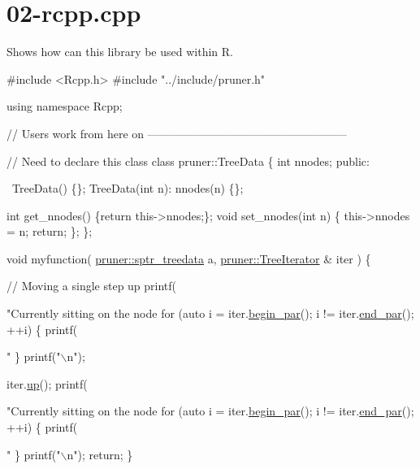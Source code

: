 \hypertarget{02-rcpp_8cpp-example}{}\section{02-\/rcpp.\+cpp}
Shows how can this library be used within R.


\begin{DoxyCodeInclude}
\textcolor{preprocessor}{#include <Rcpp.h>}
\textcolor{preprocessor}{#include "../include/pruner.h"}  

\textcolor{keyword}{using namespace }Rcpp; 

\textcolor{comment}{// Users work from here on -----------------------------------------------------}

\textcolor{comment}{// Need to declare this class}
\textcolor{keyword}{class }pruner::TreeData \{
  \textcolor{keywordtype}{int} nnodes;
\textcolor{keyword}{public}:
  
  ~TreeData() \{\};
  TreeData(\textcolor{keywordtype}{int} n): nnodes(n) \{\};
  
  \textcolor{keywordtype}{int} get\_nnodes() \{\textcolor{keywordflow}{return} this->nnodes;\};
  \textcolor{keywordtype}{void} set\_nnodes(\textcolor{keywordtype}{int} n) \{
    this->nnodes = n;
    \textcolor{keywordflow}{return};
  \};
\};

\textcolor{keywordtype}{void} myfunction(
    \hyperlink{namespacepruner_a533476fef17527e75c4fba71d8c4ce50}{pruner::sptr\_treedata} a,
    \hyperlink{classpruner_1_1TreeIterator}{pruner::TreeIterator} & iter
  ) \{
  
  \textcolor{comment}{// Moving a single step up}
  printf(\textcolor{stringliteral}{"Currently sitting on the node %
  \textcolor{keywordflow}{for} (\textcolor{keyword}{auto} i = iter.\hyperlink{classpruner_1_1TreeIterator_a3cb8dd28630f065472e135f7db822abf}{begin\_par}(); i != iter.\hyperlink{classpruner_1_1TreeIterator_aac5656fc5b550cb8dfa4a9ebd5ea910a}{end\_par}(); ++i) \{
    printf(\textcolor{stringliteral}{" %
  \}
  printf(\textcolor{stringliteral}{"\(\backslash\)n"});
  
  iter.\hyperlink{classpruner_1_1TreeIterator_adca1d999f093a69e2f5d044b358e5da7}{up}();
  printf(\textcolor{stringliteral}{"Currently sitting on the node %
  \textcolor{keywordflow}{for} (\textcolor{keyword}{auto} i = iter.\hyperlink{classpruner_1_1TreeIterator_a3cb8dd28630f065472e135f7db822abf}{begin\_par}(); i != iter.\hyperlink{classpruner_1_1TreeIterator_aac5656fc5b550cb8dfa4a9ebd5ea910a}{end\_par}(); ++i) \{
    printf(\textcolor{stringliteral}{" %
  \}
  printf(\textcolor{stringliteral}{"\(\backslash\)n"});
  \textcolor{keywordflow}{return};
\}

}}}}
\end{DoxyCodeInclude}

